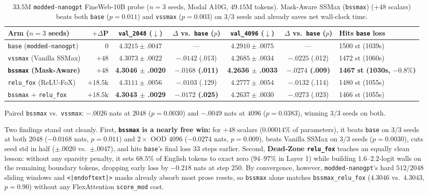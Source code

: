 \documentclass[10pt]{article}
\begin{document}
\begin{table}[ht]
  \centering
  \caption{$33.5\text{M}$ \texttt{modded-nanogpt} FineWeb-10B probe ($n=3$ seeds, Modal A10G, $49.15\text{M}$ tokens). Mask-Aware SSMax (\texttt{bssmax}) ($+48$ scalars) beats both \texttt{base} ($p=0.011$) and \texttt{vssmax} ($p=0.003$) on $3/3$ seeds and already saves net wall-clock time.}
  \label{tab:fineweb}
  \footnotesize
  \renewcommand{\arraystretch}{1.14}
  \setlength{\tabcolsep}{3.4pt}
  \begin{tabular}{@{}lrccccl@{}}
    \toprule
    Arm ($n=3$ seeds) & $+\Delta$P & \texttt{val\_2048} ($\downarrow$) & $\Delta$ vs.\ \texttt{base} ($p$) & \texttt{val\_4096} ($\downarrow$) & $\Delta$ vs.\ \texttt{base} ($p$) & Hits \texttt{base} loss \\
    \midrule
    \texttt{base} (\texttt{modded-nanogpt}) & $0$ & $4.3215 \pm .0047$ & --- & $4.2910 \pm .0075$ & --- & 1500 st (1039s) \\
    \texttt{vssmax} (Vanilla SSMax) & $+48$ & $4.3073 \pm .0022$ & $-.0142$ (.013) & $4.2685 \pm .0034$ & $-.0225$ (.012) & 1472 st (1060s) \\
    \textbf{\texttt{bssmax} (Mask-Aware)} & \textbf{$+48$} & \textbf{4.3046 $\pm$ .0020} & \textbf{$-.0168$ (.011)} & \textbf{4.2636 $\pm$ .0033} & \textbf{$-.0274$ (.009)} & \textbf{1467 st (1030s, $-0.8\%$)} \\
    \texttt{relu\_fox} (ReLU-FoX) & $+18.5\text{k}$ & $4.3111 \pm .0056$ & $-.0103$ (.129) & $4.2777 \pm .0054$ & $-.0132$ (.114) & 1480 st (1055s) \\
    \texttt{bssmax} $+$ \texttt{relu\_fox} & $+18.5\text{k}$ & \textbf{4.3043 $\pm$ .0029} & \textbf{$-.0172$ (.025)} & $4.2637 \pm .0030$ & $-.0273$ (.023) & 1466 st (1055s) \\
    \bottomrule
  \end{tabular}
  \vspace{2pt}
  \parbox{\textwidth}{\footnotesize\color{muted} Paired \texttt{bssmax} vs.\ \texttt{vssmax}: $-.0026$ nats at $2048$ ($p=\mathbf{0.0030}$) and $-.0049$ nats at $4096$ ($p=\mathbf{0.0383}$), winning $3/3$ seeds on both.}
\end{table}

Two findings stand out cleanly.
First, \textbf{\texttt{bssmax} is a nearly free win:} for $+48$ scalars ($0.00014\%$ of parameters), it beats \texttt{base} on $3/3$ seeds at both $2048$ ($-0.0168$ nats, $p=0.011$) and $2\times$ OOD $4096$ ($-0.0274$ nats, $p=0.009$), beats Vanilla SSMax on $3/3$ seeds ($p=0.0030$), cuts seed std in half ($\pm .0020$ vs.\ $\pm .0047$), and hits \texttt{base}'s final loss $33$ steps earlier.
Second, \textbf{Dead-Zone \texttt{relu\_fox}} teaches an equally clean lesson: without any sparsity penalty, it sets $\mathbf{68.5\%}$ of English tokens to exact zero ($94\text{--}97\%$ in Layer 1) while building $1.6\text{--}2.2$-logit walls on the remaining boundary tokens, dropping early loss by $-0.218$ nats at step $250$. By convergence, however, \texttt{modded-nanogpt}'s hard $512/2048$ sliding windows and \texttt{<|endoftext|>} masks already absorb most prose resets, so \texttt{bssmax} alone matches \texttt{bssmax\_relu\_fox} ($4.3046$ vs.\ $4.3043$, $p=0.90$) without any FlexAttention \texttt{score\_mod} cost.
\end{document}
